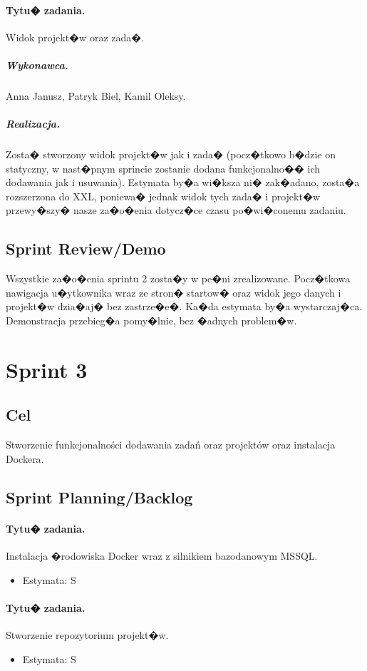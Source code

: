 ﻿\documentclass[a4paper]{article}
\begin{document}
\paragraph{Tytu� zadania.} Widok projekt�w oraz zada�.
\subparagraph{Wykonawca.} Anna Janusz, Patryk Biel, Kamil Oleksy.
\subparagraph{Realizacja.} Zosta� stworzony widok projekt�w jak i zada� (pocz�tkowo b�dzie on statyczny, w nast�pnym sprincie zostanie dodana funkcjonalno�� ich dodawania jak i usuwania). Estymata by�a wi�ksza ni� zak�adano, zosta�a rozszerzona do XXL, poniewa� jednak widok tych zada� i projekt�w przewy�szy� nasze za�o�enia dotycz�ce czasu po�wi�conemu zadaniu.


\subsection{Sprint Review/Demo}
Wszystkie za�o�enia sprintu 2 zosta�y w pe�ni zrealizowane. Pocz�tkowa nawigacja u�ytkownika wraz ze stron� startow� oraz widok jego danych i projekt�w dzia�aj� bez zastrze�e�. Ka�da estymata by�a wystarczaj�ca. Demonstracja przebieg�a pomy�lnie, bez �adnych problem�w.


\section{Sprint 3}

\subsection{Cel} Stworzenie funkcjonalności dodawania zadań oraz projektów oraz instalacja Dockera.

\subsection{Sprint Planning/Backlog}

\paragraph{Tytu� zadania.} Instalacja �rodowiska Docker wraz z silnikiem bazodanowym MSSQL.
\begin{itemize}
\item Estymata: S
\end{itemize}

\paragraph{Tytu� zadania.} Stworzenie repozytorium projekt�w.
\begin{itemize}
\item Estymata: S
\end{itemize}
\end{document}
